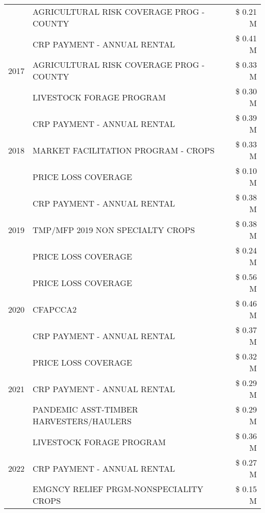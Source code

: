\begin{tabular}{llr}
 & AGRICULTURAL RISK COVERAGE PROG - COUNTY & \$ 0.21 M \\
\cline{1-3}
\multirow[t]{3}{*}{2017} & CRP PAYMENT - ANNUAL RENTAL & \$ 0.41 M \\
 & AGRICULTURAL RISK COVERAGE PROG - COUNTY & \$ 0.33 M \\
 & LIVESTOCK FORAGE PROGRAM & \$ 0.30 M \\
\cline{1-3}
\multirow[t]{3}{*}{2018} & CRP PAYMENT - ANNUAL RENTAL & \$ 0.39 M \\
 & MARKET FACILITATION PROGRAM - CROPS & \$ 0.33 M \\
 & PRICE LOSS COVERAGE & \$ 0.10 M \\
\cline{1-3}
\multirow[t]{3}{*}{2019} & CRP PAYMENT - ANNUAL RENTAL & \$ 0.38 M \\
 & TMP/MFP 2019 NON SPECIALTY CROPS & \$ 0.38 M \\
 & PRICE LOSS COVERAGE & \$ 0.24 M \\
\cline{1-3}
\multirow[t]{3}{*}{2020} & PRICE LOSS COVERAGE & \$ 0.56 M \\
 & CFAPCCA2 & \$ 0.46 M \\
 & CRP PAYMENT - ANNUAL RENTAL & \$ 0.37 M \\
\cline{1-3}
\multirow[t]{3}{*}{2021} & PRICE LOSS COVERAGE & \$ 0.32 M \\
 & CRP PAYMENT - ANNUAL RENTAL & \$ 0.29 M \\
 & PANDEMIC ASST-TIMBER HARVESTERS/HAULERS & \$ 0.29 M \\
\cline{1-3}
\multirow[t]{3}{*}{2022} & LIVESTOCK FORAGE PROGRAM & \$ 0.36 M \\
 & CRP PAYMENT - ANNUAL RENTAL & \$ 0.27 M \\
 & EMGNCY RELIEF PRGM-NONSPECIALITY CROPS & \$ 0.15 M \\
\cline{1-3}
\bottomrule
\end{tabular}
